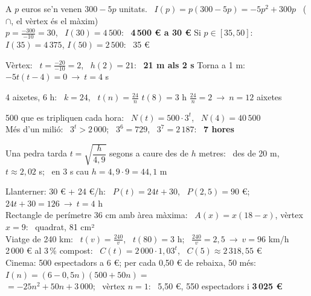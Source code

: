 \documentclass[11pt,a4paper]{article}
\begin{document}
\vfill
\begin{exemple}
A $p$ euros se'n venen $300-5p$ unitats. \ $I(p)=p(300-5p)=-5p^2+300p$ \ ($\cap$, el vèrtex és el màxim)\\[3pt]
$p=\frac{-300}{-10}=30$, \ $I(30)=4\,500$: \ \textbf{4\,500 € a 30 €} \qquad Si $p\in[35,50]$: \ $I(35)=4\,375$, $I(50)=2\,500$: \ 35 €
\end{exemple}

\vfill
\begin{exemple}[Quadràtica: \ altura d'una pilota \ $h(t)=-5t^2+20t+1$]
Vèrtex: \ $t=\frac{-20}{-10}=2$, \ $h(2)=21$: \ \textbf{21 m als 2 s} \qquad Torna a 1 m: \ $-5t(t-4)=0\ \to\ t=4$ s
\end{exemple}

\newpage
\begin{exemple}
4 aixetes, 6 h: \ $k=24$, \ $t(n)=\frac{24}{n}$ \qquad $t(8)=3$ h \qquad $\frac{24}{n}=2\ \to\ n=12$ aixetes
\end{exemple}

\vfill
\begin{exemple}
500 que es tripliquen cada hora: \ $N(t)=500\cdot3^t$, \ $N(4)=40\,500$\\[3pt]
Més d'un milió: \ $3^t>2\,000$; \ $3^6=729$, \ $3^7=2\,187$: \ \textbf{7 hores}
\end{exemple}

\vfill
\begin{exemple}
Una pedra tarda $t=\sqrt{\dfrac{h}{4{,}9}}$ segons a caure des de $h$ metres: \ des de 20 m, \ $t\approx2{,}02$ s; \ en 3 s cau $h=4{,}9\cdot9=44{,}1$ m
\end{exemple}

\vfill
\begin{exemple}
Llanterner: 30 € + 24 €/h: \ $P(t)=24t+30$, \ $P(2{,}5)=90$ €; \ $24t+30=126\ \to\ t=4$ h\\[4pt]
Rectangle de perímetre 36 cm amb àrea màxima: \ $A(x)=x(18-x)$, vèrtex $x=9$: \ quadrat, 81 cm²\\[4pt]
Viatge de 240 km: \ $t(v)=\frac{240}{v}$, \ $t(80)=3$ h; \ $\frac{240}{v}=2{,}5\ \to\ v=96$ km/h\\[4pt]
2\,000 € al 3\,\% compost: \ $C(t)=2\,000\cdot1{,}03^t$, \ $C(5)\approx2\,318{,}55$ €\\[4pt]
Cinema: 500 espectadors a 6 €; per cada 0,50 € de rebaixa, 50 més: \ $I(n)=(6-0{,}5n)(500+50n)=$\\ \hspace*{1em}$=-25n^2+50n+3\,000$; \ vèrtex $n=1$: \ 5,50 €, 550 espectadors i \textbf{3\,025 €}
\end{exemple}
\end{document}
